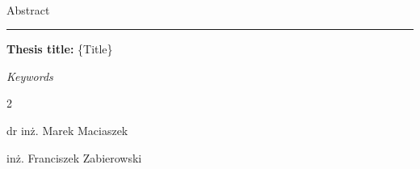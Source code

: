 \newpage
	\mbox{ }
	
	\newpage
	{\Large Abstract}\\
	{\color{sliwka}\rule[1pt]{\textwidth}{2pt}}
	
	\textbf{Thesis title:} \{Title\}
	

	\vspace{0.025\textheight}
	\textit{Keywords}\\
	\textit{}
	
	\vfill
	
	\begin{multicols}{2}
		\begin{flushleft}
			dr inż. Marek Maciaszek
		\end{flushleft}
		\begin{flushright}
			inż. Franciszek Zabierowski
		\end{flushright}
	\end{multicols}